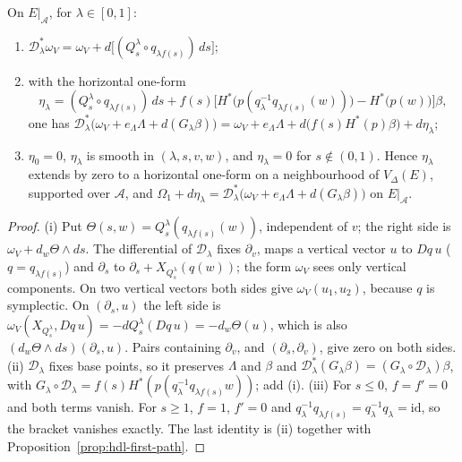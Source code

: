 \begin{lemma}[Suspension]\label{lem:hdl-suspension}
On $E|_{\mathcal A}$, for $\lambda\in[0,1]$:
\begin{enumerate}[label=(\roman*)]
\item $\mathcal D_\lambda^*\omega_V=\omega_V+d\big[(Q^\lambda_s\circ q_{\lambda f(s)})\,ds\big]$;
\item with the horizontal one-form
\[
 \eta_\lambda=(Q^\lambda_s\circ q_{\lambda f(s)})\,ds
 +f(s)\Big[H^*\big(p(q_\lambda^{-1}q_{\lambda f(s)}(w))\big)-H^*\big(p(w)\big)\Big]\beta ,
\]
one has
$\mathcal D_\lambda^*\big(\omega_V+e_\Lambda\Lambda+d(G_\lambda\beta)\big)=\omega_V+e_\Lambda\Lambda+d\big(f(s)H^*(p)\beta\big)+d\eta_\lambda$;
\item $\eta_0=0$, $\eta_\lambda$ is smooth in $(\lambda,s,v,w)$, and $\eta_\lambda=0$ for $s\notin(0,1)$.
Hence $\eta_\lambda$ extends by zero to a horizontal one-form on a neighbourhood of $V_\Delta(E)$, supported over
$\mathcal A$, and $\Omega_1+d\eta_\lambda=\mathcal D_\lambda^*\big(\omega_V+e_\Lambda\Lambda+d(G_\lambda\beta)\big)$ on $E|_{\mathcal A}$.
\end{enumerate}
\end{lemma}

\begin{proof}
(i) Put $\Theta(s,w)=Q^\lambda_s(q_{\lambda f(s)}(w))$, independent of $v$; the right side is $\omega_V+d_w\Theta\wedge ds$. The
differential of $\mathcal D_\lambda$ fixes $\partial_v$, maps a vertical vector $u$ to $Dq\,u$
($q=q_{\lambda f(s)}$) and $\partial_s$ to $\partial_s+X_{Q^\lambda_s}(q(w))$; the form $\omega_V$ sees only vertical
components. On two vertical vectors both sides give $\omega_V(u_1,u_2)$, because $q$ is symplectic. On
$(\partial_s,u)$ the left side is $\omega_V(X_{Q^\lambda_s},Dq\,u)=-dQ^\lambda_s(Dq\,u)=-d_w\Theta(u)$, which is also
$(d_w\Theta\wedge ds)(\partial_s,u)$. Pairs containing $\partial_v$, and $(\partial_s,\partial_v)$, give zero on both sides.
(ii) $\mathcal D_\lambda$ fixes base points, so it preserves $\Lambda$ and $\beta$ and
$\mathcal D_\lambda^*(G_\lambda\beta)=(G_\lambda\circ\mathcal D_\lambda)\beta$, with
$G_\lambda\circ\mathcal D_\lambda=f(s)H^*(p(q_\lambda^{-1}q_{\lambda f(s)}w))$; add (i).
(iii) For $s\le0$, $f=f'=0$ and both terms vanish. For $s\ge1$, $f=1$, $f'=0$ and
$q_\lambda^{-1}q_{\lambda f(s)}=q_\lambda^{-1}q_\lambda=\mathrm{id}$, so the bracket vanishes exactly. The last identity is (ii)
together with Proposition~\ref{prop:hdl-first-path}.
\end{proof}

